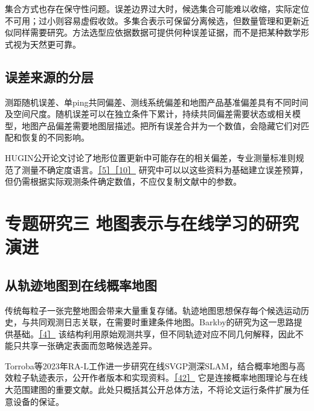集合方式也存在保守性问题。误差边界过大时，候选集合可能难以收缩，实际定位不可用；过小则容易虚假收敛。多集合表示可保留分离候选，但数量管理和更新近似同样需要研究。方法选型应依据数据可提供何种误差证据，而不是把某种数学形式视为天然更可靠。

\hypertarget{ux8befux5deeux6765ux6e90ux7684ux5206ux5c42}{%
\subsection{误差来源的分层}\label{ux8befux5deeux6765ux6e90ux7684ux5206ux5c42}}

测距随机误差、单ping共同偏差、测线系统偏差和地图产品基准偏差具有不同时间及空间尺度。随机误差可以在独立条件下累计，持续共同偏差需要状态或相关模型，地图产品偏差需要地图层描述。把所有误差合并为一个数值，会隐藏它们对匹配和恢复的不同影响。

HUGIN公开论文讨论了地形位置更新中可能存在的相关偏差，专业测量标准则规范了测量不确定度语言。\href{https://www.navlab.net/Publications/The_HUGIN_AUV_Terrain_Navigation_Module.pdf}{［5］}\href{https://iho.int/uploads/user/pubs/standards/s-44/S-44_Edition_6.2.0_adopted.pdf}{［10］} 研究中可以以这些资料为基础建立误差预算，但仍需根据实际观测条件确定数值，不应仅复制文献中的参数。

\hypertarget{ux4e13ux9898ux7814ux7a76ux4e09-ux5730ux56feux8868ux793aux4e0eux5728ux7ebfux5b66ux4e60ux7684ux7814ux7a76ux6f14ux8fdb}{%
\section{专题研究三 地图表示与在线学习的研究演进}\label{ux4e13ux9898ux7814ux7a76ux4e09-ux5730ux56feux8868ux793aux4e0eux5728ux7ebfux5b66ux4e60ux7684ux7814ux7a76ux6f14ux8fdb}}

\hypertarget{ux4eceux8f68ux8ff9ux5730ux56feux5230ux5728ux7ebfux6982ux7387ux5730ux56fe}{%
\subsection{从轨迹地图到在线概率地图}\label{ux4eceux8f68ux8ff9ux5730ux56feux5230ux5728ux7ebfux6982ux7387ux5730ux56fe}}

传统每粒子一张完整地图会带来大量重复存储。轨迹地图思想保存每个候选运动历史，与共同观测日志关联，在需要时重建条件地图。Barkby的研究为这一思路提供基础。\href{https://doi.org/10.1177/0278364912459666}{［4］} 该结构利用原始观测共享，但不同轨迹对应不同几何解释，因此不能只共享一张确定表面而忽略候选差异。

Torroba等2023年RA-L工作进一步研究在线SVGP测深SLAM，结合概率地图与高效粒子轨迹表示，公开作者版本和实现资料。\href{https://arxiv.org/abs/2211.05601}{［42］} 它是连接概率地图理论与在线大范围建图的重要文献。此处只概括其公开总体方法，不将论文运行条件扩展为任意设备的保证。

